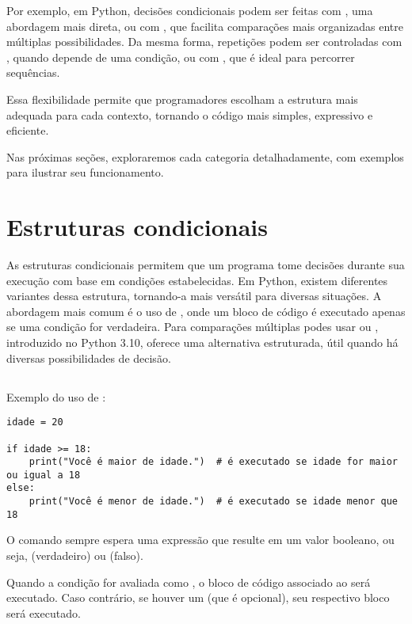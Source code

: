 Por exemplo, em Python, decisões condicionais podem ser feitas com , uma abordagem mais direta, ou
com , que facilita comparações mais organizadas entre múltiplas possibilidades.
Da mesma forma, repetições podem ser controladas com , quando depende de uma condição, ou
com , que é ideal para percorrer sequências.

Essa flexibilidade permite que programadores escolham a estrutura mais adequada para cada contexto, tornando o
código mais simples, expressivo e eficiente.

Nas próximas seções, exploraremos cada categoria detalhadamente, com exemplos para ilustrar seu funcionamento.



\section{Estruturas condicionais}\label{if}
As estruturas condicionais permitem que um programa tome decisões durante sua execução com base em condições
estabelecidas.
Em Python, existem diferentes variantes dessa estrutura, tornando-a mais versátil para diversas situações.
A abordagem mais comum é o uso de , onde um bloco de código é executado apenas se uma condição for
verdadeira.
Para comparações múltiplas podes usar  ou ,
introduzido no Python 3.10, oferece uma alternativa estruturada, útil quando há diversas possibilidades de decisão.


\subsection{}
Exemplo do uso de :
\begin{verbatim}
idade = 20

if idade >= 18:
    print("Você é maior de idade.")  # é executado se idade for maior ou igual a 18
else:
    print("Você é menor de idade.")  # é executado se idade menor que 18
\end{verbatim}

O comando  sempre espera uma expressão que resulte em um valor booleano,
ou seja,  (verdadeiro) ou  (falso).

Quando a condição for avaliada como , o bloco de código associado ao  será executado.
Caso contrário, se houver um  (que é opcional), seu respectivo bloco será executado.

